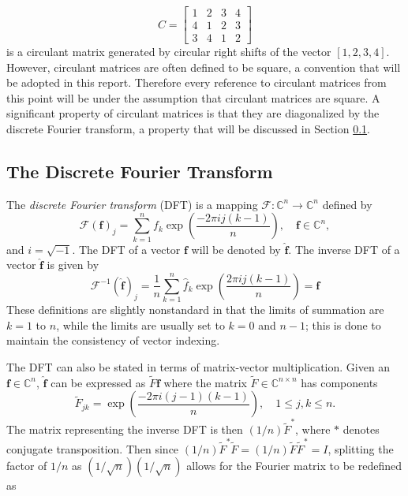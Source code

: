 \documentclass[12pt]{article}
\newcommand{\ctrans}{*}	%
\begin{document}
\[C = \begin{bmatrix}
1 & 2 & 3 & 4 \\
4 & 1 & 2 & 3 \\
3 & 4 & 1 & 2
\end{bmatrix}\] 
is a circulant matrix generated by circular right shifts of the vector $[1,2,3,4]$. However, circulant matrices are often defined to be square, a convention that will be adopted in this report. Therefore every reference to circulant matrices from this point will be under the assumption that circulant matrices are square. A significant property of circulant matrices is that they are diagonalized by the discrete Fourier transform, a property that will be discussed in Section \ref{The Discrete Fourier Transform}.

\subsection{The Discrete Fourier Transform} \label{The Discrete Fourier Transform}
The \textit{discrete Fourier transform} (DFT) is a mapping $\mathcal{F}:\mathbb{C}^n \rightarrow \mathbb{C}^n$ defined by
\begin{equation}
\mathcal{F}(\mathbf{f})_j = \sum_{k=1}^{n} f_{k}\exp\left(\frac{-2\pi{ij}(k-1)}{n}\right), \quad \mathbf{f}\in\mathbb{C}^n,
\label{Eq_DFT}
\end{equation}
and $i = \sqrt{-1}$. The DFT of a vector $\mathbf{f}$ will be denoted by $\widehat{\mathbf{f}}$. The inverse DFT of a vector $\widehat{\mathbf{f}}$ is given by
\begin{equation}
\mathcal{F}^{-1}(\widehat{\mathbf{f}})_j = \frac{1}{n}\sum_{k=1}^{n} \widehat{f}_k\exp\left(\frac{2\pi{ij}(k-1)}{n}\right) = \mathbf{f}
\end{equation}
These definitions are slightly nonstandard in that the limits of summation are $k = 1$ to $n$, while the limits are usually set to $k = 0$ and $n-1$; this is done to maintain the consistency of vector indexing. \par 
The DFT can also be stated in terms of matrix-vector multiplication. Given an $\mathbf{f} \in \mathbb{C}^n$, $\widehat{\mathbf{f}}$ can be expressed as $\widetilde{F}\mathbf{f}$ where the matrix $\widetilde{F}\in\mathbb{C}^{n\times{n}}$ has components
\[\widetilde{F}_{jk} = \exp\left(\frac{-2\pi{i(j-1)(k-1)}}{n}\right), \quad 1 \leq j,k \leq n.\] 
The matrix representing the inverse DFT is then $(1/n)\widetilde{F}^\ctrans$, where $\ctrans$ denotes conjugate transposition. Then since $(1/n)\widetilde{F}^\ctrans\widetilde{F} = (1/n)\widetilde{F}\widetilde{F}^\ctrans = I$, splitting the factor of $1/n$ as $(1/\sqrt{n})(1/\sqrt{n})$ allows for the Fourier matrix to be redefined as
\end{document}
